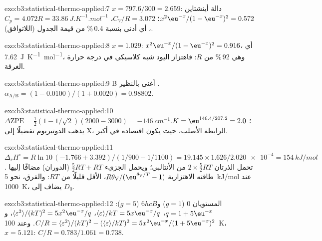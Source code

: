 \begin{solution}{exo:b3:statistical-thermo-applied:7}
$x = 797.6/300 = 2.659$: دالة أينشتاين $x^2\eu^{-x}/(1 - \eu^{-x})^2 = 0.572$؛ $C_V/R = 3.072$،
$C_p = 4.072R = \qty{33.86}{J.K^{-1}.mol^{-1}}$، أي أدنى بنسبة 0.4\,\% من قيمة الجدول (اللاتوافق).
\end{solution}

\begin{solution}{exo:b3:statistical-thermo-applied:8}
$x = 1.029$: $x^2\eu^{-x}/(1 - \eu^{-x})^2 = 0.916$، أي \qty{7.62}{J.K^{-1}.mol^{-1}}، وهي 92\,\% من $R$: فاهتزاز
اليود شبه كلاسيكي في درجة حرارة الغرفة.
\end{solution}

\begin{solution}{exo:b3:statistical-thermo-applied:9}
B أغنى بالنظير . $\alpha_{\mathrm{A/B}} = (1 - 0.0100)/(1 + 0.0020) = 0.98802$.
\end{solution}

\begin{solution}{exo:b3:statistical-thermo-applied:10}
$\Delta\mathrm{ZPE} = \frac12(1 - 1/\sqrt2)(2000 - 3000) = \qty{-146}{cm^{-1}}$؛ $K = \eu^{146.4/207.2} = 2.0$.
يذهب الدوتيريوم تفضيلًا إلى X، الرابطة الأصلب، حيث يكون اقتصاده في  أكبر.
\end{solution}

\begin{solution}{exo:b3:statistical-thermo-applied:11}
$\Delta_rH^\circ = R\ln10\,(-1.766 + 3.392)/(1/900 - 1/1100) = 19.145 \times 1.626/\num{2.020e-4} =
\qty{154}{kJ/mol}$. تحمل الذرتان $2 \times \frac52RT$ من الأنتالبي؛ ويحمل الجزيء $\frac52RT + RT$
(الدوران) مضافًا إليها طاقته الاهتزازية $R\theta_{\mathrm V}/(\eu^{\theta_{\mathrm V}/T} - 1)$، الأقل قليلًا من $RT$:
والفرق، نحو \qty{5}{kJ/mol} عند \qty{1000}{K}، يضاف إلى $D_0$.
\end{solution}

\begin{solution}{exo:b3:statistical-thermo-applied:12}
المستويان 0 ($g = 1$) و$6hcB$ ($g = 5$): $q = 1 + 5\eu^{-x}$، $\langle\varepsilon\rangle/kT = 5x\eu^{-x}/q$، $\langle\varepsilon^2\rangle/(kT)^2 =
5x^2\eu^{-x}/q$، و$C/R = \langle\varepsilon^2\rangle/(kT)^2 - (\langle\varepsilon\rangle/kT)^2 = 5x^2\eu^{-x}/(1 + 5\eu^{-x})^2$. وعند
\qty{100}{K}، $x = 5.121$: $C/R = 0.783/1.061 = 0.738$.
\end{solution}

